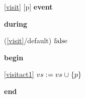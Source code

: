 \noindent \ref{visit} [p] \textbf{event}
\begin{block}
  \item   \textbf{during}
  \begin{block}
  \item[ (\ref{visit}/default) ]\sout{$\text{false}$} %
  \end{block}
  \item   \textbf{begin}
  \begin{block}
  \item[ \eqref{visitact1} ]{$vs \mathrel{:\mkern1mu=} vs \mathbin{\mkern1mu\cup\mkern1mu} \{ p \} $} %
  \end{block}
  \item   \textbf{end} \\
\end{block}
